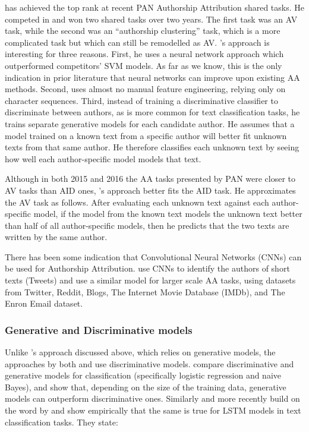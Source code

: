 \citet{bagnall2015author,bagnall2016authorship} has achieved the top rank at recent PAN Authorship Attribution shared tasks. He competed in and won two shared tasks over two years. The first task was an AV task, while the second was an ``authorship clustering'' task, which is a more complicated task but which can still be remodelled as AV. \citeauthor{bagnall2016authorship}'s approach is interesting for three reasons. First, he uses a neural network approach which outperformed competitors' SVM models. As far as we know, this is the only indication in prior literature that neural networks can improve upon existing AA methods. Second, \citeauthor{bagnall2015author} uses almost no manual feature engineering, relying only on character sequences. Third, instead of training a discriminative classifier to discriminate between authors, as is more common for text classification tasks, he trains separate generative models for each candidate author. He assumes that a model trained on a known text from a specific author will better fit unknown texts from that same author. He therefore classifies each unknown text by seeing how well each author-specific model models that text.

Although in both 2015 and 2016 the AA tasks presented by PAN were closer to AV tasks than AID ones, \citeauthor{bagnall2015author}'s approach better fits the AID task. He approximates the AV task as follows. After evaluating each unknown text against each author-specific model, if the model from the known text models the unknown text better than half of all author-specific models, then he predicts that the two texts are written by the same author.

There has been some indication that Convolutional Neural Networks (CNNs) can be used for Authorship Attribution. \citet{shrestha2017convolutional} use CNNs to identify the authors of short texts (Tweets) and \citet{ruder2016character} use a similar model for larger scale AA tasks, using datasets from Twitter, Reddit, Blogs, The Internet Movie Database (IMDb), and The Enron Email dataset.

\subsubsection{Generative and Discriminative models}
Unlike \citeauthor{bagnall2015author}'s approach discussed above, which relies on generative models, the approaches by both \citet{shrestha2017convolutional} and \citet{ruder2016character} use discriminative models. \citet{ng2002discriminative} compare discriminative and generative models for classification (specifically logistic regression and naive Bayes), and show that, depending on the size of the training data, generative models can outperform discriminative ones. Similarly and more recently \citet{yogatama2017generative} build on the word by \citeauthor{ng2002discriminative} and show empirically that the same is true for LSTM models in text classification tasks. They state:


